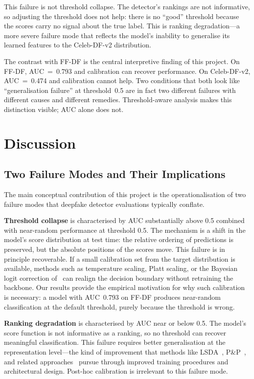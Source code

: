 \documentclass[a4paper,12pt]{report}
\begin{document}
This failure is not threshold collapse.
The detector's rankings are not informative, so adjusting
the threshold does not help: there is no ``good'' threshold
because the scores carry no signal about the true label.
This is ranking degradation---a more severe failure mode
that reflects the model's inability to generalise its
learned features to the Celeb-DF-v2 distribution.

The contrast with FF-DF is the central interpretive
finding of this project.
On FF-DF, AUC~=~0.793 and calibration can recover
performance.
On Celeb-DF-v2, AUC~=~0.474 and calibration cannot help.
Two conditions that both look like ``generalisation failure''
at threshold~0.5 are in fact two different failures with
different causes and different remedies.
Threshold-aware analysis makes this distinction visible;
AUC alone does not.

\chapter{Discussion}

\section{Two Failure Modes and Their Implications}

The main conceptual contribution of this project is the
operationalisation of two failure modes that deepfake
detector evaluations typically conflate.

\textbf{Threshold collapse} is characterised by AUC
substantially above 0.5 combined with near-random
performance at threshold 0.5.
The mechanism is a shift in the model's score distribution
at test time: the relative ordering of predictions is
preserved, but the absolute positions of the scores
move.
This failure is in principle recoverable.
If a small calibration set from the target distribution
is available, methods such as temperature scaling,
Platt scaling, or the Bayesian logit correction
of~\cite{aigicalib2025} can realign the decision boundary
without retraining the backbone.
Our results provide the empirical motivation for why
such calibration is necessary: a model with AUC~0.793
on FF-DF produces near-random classification at the
default threshold, purely because the threshold is wrong.

\textbf{Ranking degradation} is characterised by AUC
near or below 0.5.
The model's score function is not informative as a
ranking, so no threshold can recover meaningful
classification.
This failure requires better generalisation at the
representation level---the kind of improvement that
methods like LSDA~\cite{lsda2024},
P\&P~\cite{p_and_p2025}, and related
approaches~\cite{gend2025} pursue through improved
training procedures and architectural design.
Post-hoc calibration is irrelevant to this failure mode.
\end{document}

